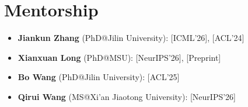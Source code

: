 \documentclass[11pt,a4paper,roman]{moderncv}        %
\begin{document}
\section{Mentorship}
\begin{minipage}{\maincolumnwidth}%
	\small{
    	\begin{itemize}
        			\item{\textbf{Jiankun Zhang} (PhD@Jilin University): [ICML'26], [ACL'24]}
        			\item{\textbf{Xianxuan Long} (PhD@MSU): [NeurIPS'26], [Preprint]}
        			\item{\textbf{Bo Wang} (PhD@Jilin University): [ACL'25]}
        			\item{\textbf{Qirui Wang} (MS@Xi'an Jiaotong University): [NeurIPS'26]}
		\end{itemize}}%
\end{minipage}%

\nocite{*}



\end{document}
